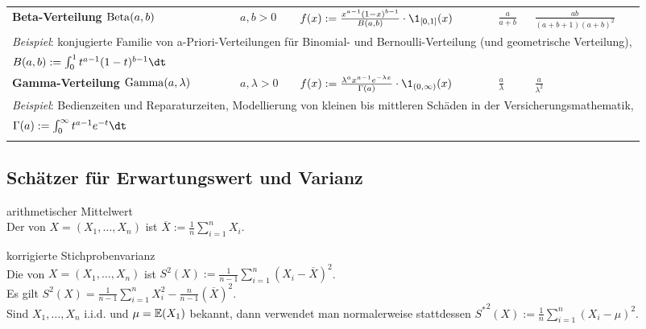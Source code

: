 \begin{landscape}
\begin{tabular}{p{85mm}p{40mm}p{65mm}p{20mm}p{27mm}}
    \addlinespace[5mm]
    \midrule
    \textbf{Beta-Verteilung $\operatorname{Beta}(a, b)$} &
    $a, b > 0$ &
    $f(x) := \frac{x^{a-1} (1-x)^{b-1}}{B(a, b)} \cdot \1_{[0,1]}(x)$ &
    $\frac{a}{a+b}$ &
    $\frac{ab}{(a+b+1)(a+b)^2}$\\
    \multicolumn{5}{l}{\emph{Beispiel}:
    konjugierte Familie von a-Priori-Verteilungen für Binomial- und Bernoulli-Verteilung
    (und geometrische Verteilung),}\\
    \multicolumn{5}{l}{$B(a, b) := \int_0^1 t^{a-1} (1-t)^{b-1} \dt$}\\

    \addlinespace[5mm]
    \midrule
    \textbf{Gamma-Verteilung $\operatorname{Gamma}(a, \lambda)$} &
    $a, \lambda > 0$ &
    $f(x) := \frac{\lambda^a x^{a-1} e^{-\lambda x}}{\Gamma(a)} \cdot \1_{(0,\infty)}(x)$ &
    $\frac{a}{\lambda}$ &
    $\frac{a}{\lambda^2}$\\
    \multicolumn{5}{l}{\emph{Beispiel}:
    Bedienzeiten und Reparaturzeiten, Modellierung von kleinen bis mittleren Schäden in der
    Versicherungsmathematik,}\\
    \multicolumn{5}{l}{$\Gamma(a) := \int_0^\infty t^{a-1} e^{-t}\dt$}\\

    \addlinespace[5mm]
    \bottomrule
\end{tabular}
\end{landscape}

\subsection{%
    Schätzer für Erwartungswert und Varianz%
}

\begin{Def}{arithmetischer Mittelwert}\\
    Der  von $X = (X_1, \dotsc, X_n)$ ist
    $\overline{X} := \frac{1}{n} \sum_{i=1}^n X_i$.
\end{Def}

\begin{Def}{korrigierte Stichprobenvarianz}\\
    Die  von $X = (X_1, \dotsc, X_n)$ ist
    $S^2(X) := \frac{1}{n-1} \sum_{i=1}^n (X_i - \overline{X})^2$.\\
    Es gilt $S^2(X) = \frac{1}{n-1} \sum_{i=1}^n X_i^2 - \frac{n}{n-1} (\overline{X})^2$.\\
    Sind $X_1, \dotsc, X_n$ i.i.d. und $\mu = \mathbb{E}(X_1)$ bekannt,
    dann verwendet man normalerweise stattdessen
    ${S^\ast}^2(X) := \frac{1}{n} \sum_{i=1}^n (X_i - \mu)^2$.
\end{Def}

